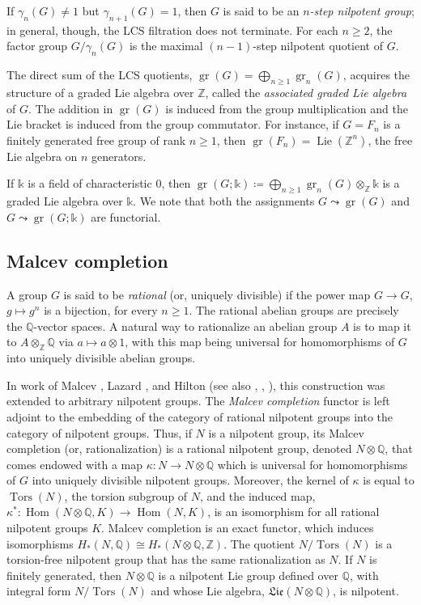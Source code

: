 \documentclass{article}
\numberwithin{equation}{section}
\theoremstyle{definition}
\newcommand{\Z}{\mathbb{Z}}
\newcommand{\Q}{\mathbb{Q}}
\renewcommand{\k}{\mathbb{k}}
\DeclareMathOperator{\gr}{gr}
\DeclareMathOperator{\Hom}{{Hom}}
\DeclareMathOperator{\Lie}{Lie}
\DeclareMathOperator{\Tors}{Tors}
\begin{document}
If $\gamma_{n} (G)\ne 1$ but $\gamma_{n+1}(G)=1$, then 
$G$ is said to be an {\em $n$-step nilpotent group}; in general, 
though, the LCS filtration does not terminate. For each $n\ge 2$, 
the factor group $G/\gamma_{n}(G)$ is the maximal $(n-1)$-step 
nilpotent quotient of $G$. 

The direct sum of the LCS quotients, $\gr (G)  = \bigoplus_{n\ge 1} \gr_{n} (G)$, 
acquires the structure of a graded Lie algebra over $\Z$, called the 
{\em associated graded Lie algebra}\/ of $G$. The addition in $\gr (G)$ 
is induced from the group multiplication and the Lie bracket is induced 
from the group commutator. For instance, if $G=F_n$ is a finitely 
generated free group of rank $n\ge 1$, then $\gr(F_n)=\Lie(\Z^n)$, 
the free Lie algebra on $n$ generators. 

If $\k$ is a field of characteristic $0$, then 
$\gr (G;\k)  \coloneqq \bigoplus_{n\ge 1} \gr_{n} (G)\otimes_{\Z} \k$ 
is a graded Lie algebra over $\k$. We note that both the 
assignments $G\leadsto \gr(G)$ and $G\leadsto \gr(G;\k)$ 
are functorial. 

\subsection{Malcev completion}
\label{subsec:mg}
A group $G$ is said to be {\em rational}\/ (or, uniquely divisible) 
if the power map $G\to G$, $g\mapsto g^n$ is a bijection, for 
every $n\ge 1$. The rational abelian groups are precisely the 
$\Q$-vector spaces. A natural way to rationalize an 
abelian group $A$ is to map it to $A\otimes_{\Z} \Q$ 
via $a\mapsto a\otimes 1$, with this map being universal 
for homomorphisms of $G$ into uniquely divisible abelian groups.

In work of Malcev \cite{Malcev}, Lazard \cite{Lazard}, and Hilton \cite{Hilton} 
(see also \cite{BK72}, \cite{HMR}, \cite{Iv}), this construction was extended 
to arbitrary nilpotent groups. The {\em Malcev completion}\/ functor is left 
adjoint to the embedding of the category 
of rational nilpotent groups into the category of nilpotent groups.
Thus, if $N$ is a nilpotent group, its Malcev completion (or, rationalization) 
 is a rational nilpotent group, denoted $N\otimes \Q$, that comes endowed 
with a map $\kappa\colon N\to N\otimes \Q$ which is universal 
for homomorphisms of $G$ into uniquely divisible nilpotent groups.
Moreover, the kernel of $\kappa$ is equal to $\Tors(N)$, the torsion 
subgroup of $N$, and the induced map, 
$\kappa^*\colon \Hom(N\otimes \Q,K)\to \Hom(N,K)$, 
is an isomorphism for all rational nilpotent groups $K$. 
Malcev completion is an exact functor, 
which induces isomorphisms $H_*(N,\Q)\cong H_*(N\otimes \Q,\Z)$. 
The quotient $N/\Tors(N)$ is a torsion-free nilpotent group that has 
the same rationalization as $N$. If $N$ is finitely generated, 
then $N\otimes \Q$ is a nilpotent Lie group defined over $\Q$, 
with integral form $N/\Tors(N)$ and whose Lie algebra, 
$\mathfrak{Lie}(N\otimes \Q)$, is nilpotent.
\end{document}
